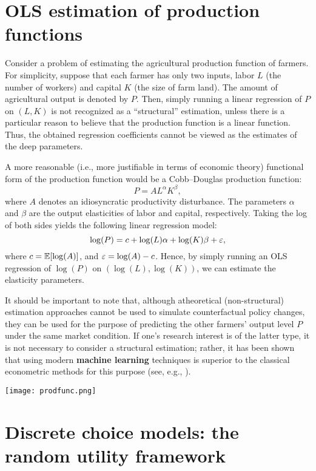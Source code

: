 \documentclass[11pt, A4paper, openany, uplatex]{book}
\begin{document}
\section{OLS estimation of production functions}
Consider a problem of estimating the agricultural production function of farmers.
For simplicity, suppose that each  farmer has only two inputs, labor $L$ (the number of workers) and capital $K$ (the size of farm land). 
The amount of agricultural output is denoted by $P$.
Then, simply running a linear regression of $P$ on $(L,K)$ is not recognized as a ``structural'' estimation, unless there is a particular reason to believe that the production function is a linear function.
Thus, the obtained regression coefficients cannot be viewed as the estimates of the deep parameters.

A more reasonable (i.e., more justifiable in terms of economic theory) functional form of the production function would be a Cobb--Douglas production function:
\[
	P = A L^\alpha K^\beta,
\] 
where $A$  denotes an idiosyncratic productivity disturbance.
The parameters $\alpha$ and $\beta$ are the output elasticities of labor and capital, respectively.
Taking the log of both sides yields the following linear regression model:
\[
	\log(P) = c + \log(L) \alpha + \log(K) \beta + \varepsilon,
\]
where $c = \mathbb{E}[\log(A)]$, and $\varepsilon = \log(A) - c$.
Hence, by simply running an OLS regression of $\log(P)$ on $(\log(L), \log(K))$, we can estimate the elasticity parameters.

It should be important to note that, although atheoretical (non-structural) estimation approaches cannot be used to simulate counterfactual policy changes, they can be used for the purpose of predicting the other farmers' output level $P$ under the same market condition.
If one's research interest is of the latter type, it is not necessary to consider a structural estimation; rather, it has been shown that using modern \textbf{machine learning} techniques is superior to the classical econometric methods for this purpose (see, e.g., \cite{bajari2015machine}).

\begin{center}
	\texttt{[image: prodfunc.png]}
\end{center}

\section{Discrete choice models: the random utility framework}
\end{document}
